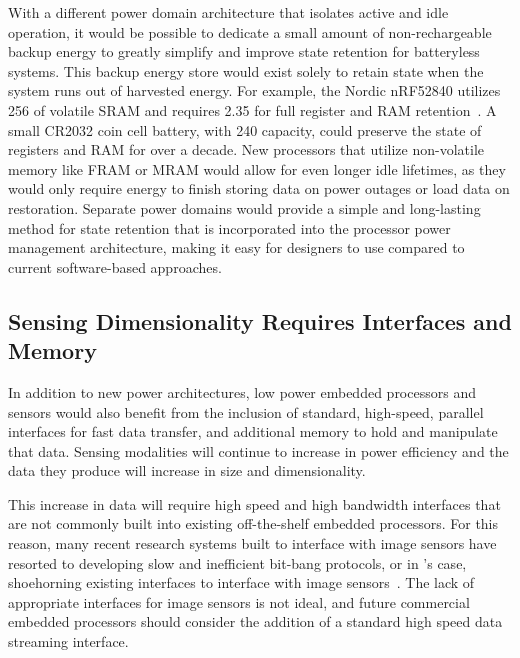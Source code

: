 With a different power domain architecture that isolates active and idle operation, it would be possible to dedicate a small amount of non-rechargeable backup energy to greatly simplify and improve state retention for batteryless systems.
This backup energy store would exist solely to retain state when the system runs out of harvested energy.
For example, the Nordic nRF52840 utilizes 256\ssi{\kilo\byte} of volatile SRAM and requires 2.35\ssi{\micro\watt} for full register and RAM retention~\cite{nrf52840}.
A small CR2032 coin cell battery, with 240\ssi{\milli\Ah} capacity, could preserve the state of registers and RAM for over a decade.
New processors that utilize non-volatile memory like FRAM or MRAM would allow for even longer idle lifetimes, as they would only require energy to finish storing data on power outages or load data on restoration.
Separate power domains would provide a simple and long-lasting method for state retention that is incorporated into the processor power management architecture, making it easy for designers to use compared to current software-based approaches.

\subsection{Sensing Dimensionality Requires Interfaces and Memory}
In addition to new power architectures, low power embedded processors and sensors would also benefit from the inclusion of standard, high-speed, parallel interfaces for fast data transfer, and additional memory to hold and manipulate that data.
Sensing modalities will continue to increase in power efficiency and the data they produce will increase in size and dimensionality.

This increase in data will require high speed and high bandwidth interfaces that are not commonly built into existing off-the-shelf embedded processors.
For this reason, many recent research systems built to interface with image sensors have resorted to developing slow and inefficient bit-bang protocols, or in \namec{}'s case, shoehorning existing interfaces to interface with image sensors~\cite{josephson2019wireless, desai2022camaroptera}.
The lack of appropriate interfaces for image sensors is not ideal, and future commercial embedded processors should consider the addition of a standard high speed data streaming interface.


